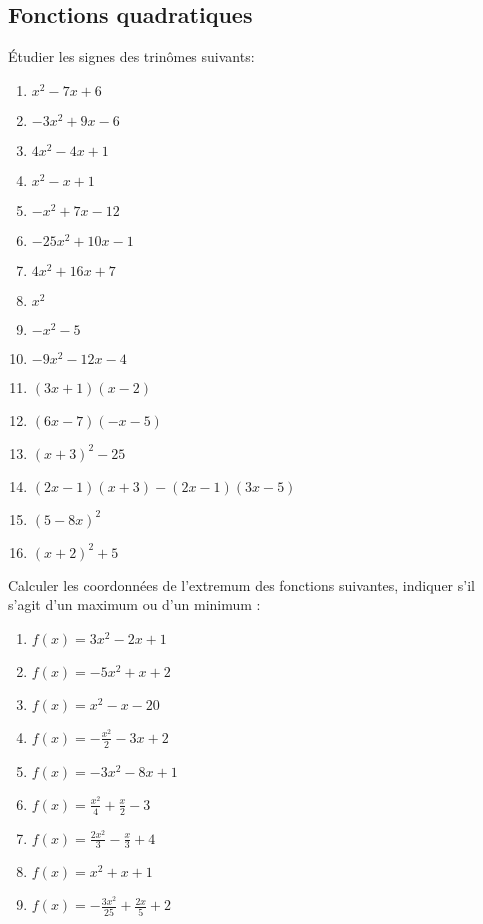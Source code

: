 \subsection{Fonctions quadratiques}

\begin{exercice}
\begin{multicols}{2}
Étudier les signes des trinômes suivants:
\begin{enumerate}
\item ${{x}^{2}}-7x+6$ 
\item $-3{{x}^{2}}+9x-6$ 
\item $4{{x}^{2}}-4x+1$ 
\item ${{x}^{2}}-x+1$ 
\item $-{{x}^{2}}+7x-12$
\item $-25{{x}^{2}}+10x-1$ 
\item $4{{x}^{2}}+16x+7$
\item ${{x}^{2}}$
\item $-{{x}^{2}}-5$
\item $-9{{x}^{2}}-12x-4$
\item $\left( 3x+1 \right)\left( x-2 \right)$
\item $\left( 6x-7 \right)\left( -x-5 \right)$
\item ${{\left( x+3 \right)}^{2}}-25$
\item $\left( 2x-1 \right)\left( x+3 \right)-\left( 2x-1 \right)\left( 3x-5 \right)$
\item ${{\left( 5-8x \right)}^{2}}$
\item ${{\left( x+2 \right)}^{2}}+5$
\end{enumerate}
\end{multicols}
\end{exercice}

\begin{exercice}
Calculer les coordonnées de l'extremum des fonctions suivantes, indiquer s'il s'agit d'un maximum ou d'un  minimum :
\begin{multicols}{2}
\begin{enumerate}
\item $f(x)=3{{x}^{2}}-2x+1$ 
\item $f(x)=-5{{x}^{2}}+x+2$ 
\item $f(x)={{x}^{2}}-x-20$ 
\item $f(x)=-\frac{{{x}^{2}}}{2}-3x+2$
\item $f(x)=-3{{x}^{2}}-8x+1$
\item $f(x)=\frac{{{x}^{2}}}{4}+\frac{x}{2}-3$
\item $f(x)=\frac{2{{x}^{2}}}{3}-\frac{x}{3}+4$
\item $f(x)={{x}^{2}}+x+1$
\item $f(x)=-\frac{3{{x}^{2}}}{25}+\frac{2x}{5}+2$
\end{enumerate}
\end{multicols}
\end{exercice}

